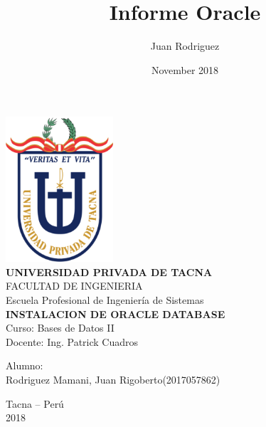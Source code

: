 \documentclass[12pt,letterpaper]{article}
\title{Informe Oracle}
\author{Juan Rodriguez}
\date{November 2018}
\begin{document}
    
    \begin{center}
        \includegraphics[width=4cm]{Imagenes/upt-logo.png}\\
        \vspace{12pt}
        \vspace{12pt}
        \large\textbf{UNIVERSIDAD PRIVADA DE TACNA}\\
        \vspace{12pt}
        \vspace{12pt}
        \large{FACULTAD DE INGENIERIA}\\
        \vspace{12pt}
        \vspace{12pt}
        \large{Escuela Profesional de Ingeniería de Sistemas}\\
        \vspace{12pt}
        \vspace{12pt}
        \textbf{INSTALACION DE ORACLE DATABASE}\\
        \vspace{12pt}
        \vspace{12pt}
        Curso: Bases de Datos II\\
        \vspace{12pt}
        Docente: Ing. Patrick Cuadros\\
        \vspace*{12pt}
           \begin{flushleft}
        Alumno:\\
        \vspace{12pt}
        Rodriguez Mamani, Juan Rigoberto\hfill (2017057862)\\

        \end{flushleft}
        \vspace{100pt}

        Tacna – Perú\\
            2018
        \vspace{12pt}
        
    \end{center}
    \thispagestyle{empty} %
    \newpage
    \tableofcontents %
    \thispagestyle{empty} %
    \newpage
    \setcounter{page}{1} %

    
    
    
    
    
    
    
\end{document}
